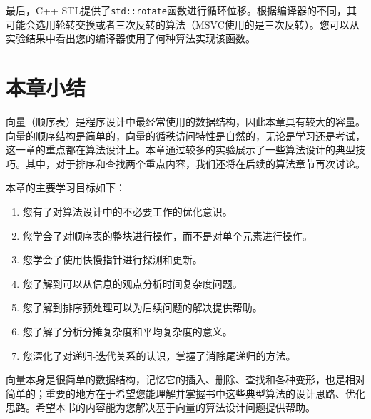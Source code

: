 最后，C++ STL提供了\lstinline{std::rotate}函数进行循环位移。根据编译器的不同，其可能会选用轮转交换或者三次反转的算法（MSVC使用的是三次反转）。您可以从实验结果中看出您的编译器使用了何种算法实现该函数。

\section{本章小结}
向量（顺序表）是程序设计中最经常使用的数据结构，因此本章具有较大的容量。向量的顺序结构是简单的，向量的循秩访问特性是自然的，无论是学习还是考试，这一章的重点都在算法设计上。本章通过较多的实验展示了一些算法设计的典型技巧。其中，对于排序和查找两个重点内容，我们还将在后续的算法章节再次讨论。

本章的主要学习目标如下：
\begin{enumerate}
    \item 您有了对算法设计中的不必要工作的优化意识。
    \item 您学会了对顺序表的整块进行操作，而不是对单个元素进行操作。
    \item 您学会了使用快慢指针进行探测和更新。
    \item 您了解到可以从信息的观点分析时间复杂度问题。
    \item 您了解到排序预处理可以为后续问题的解决提供帮助。
    \item 您了解了分析分摊复杂度和平均复杂度的意义。
    \item 您深化了对递归-迭代关系的认识，掌握了消除尾递归的方法。
\end{enumerate}

向量本身是很简单的数据结构，记忆它的插入、删除、查找和各种变形，也是相对简单的；重要的地方在于希望您能理解并掌握书中这些典型算法的设计思路、优化思路。希望本书的内容能为您解决基于向量的算法设计问题提供帮助。




